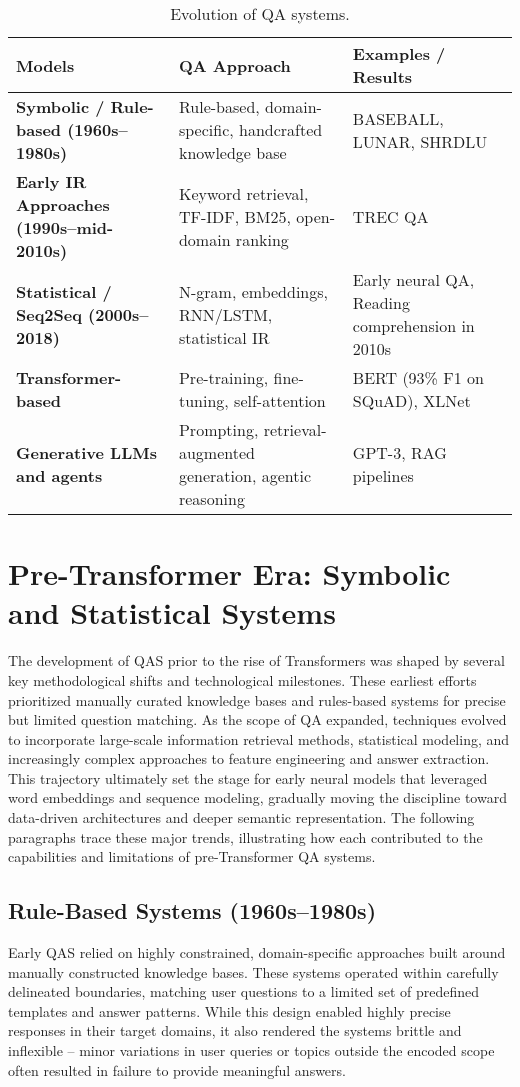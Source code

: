 \begin{spacing}{1.5}
\addtocounter{table}{-1}
\begin{table}[H]
\centering
\begin{tabularx}{\textwidth}{>{\raggedright\arraybackslash\bfseries}X >{\raggedright\arraybackslash}X >{\raggedright\arraybackslash}X}
\toprule
\textbf{Models} & \textbf{QA Approach} & \textbf{Examples / Results}\\
\midrule
Symbolic / Rule-based (1960s–1980s) & Rule-based, domain-specific, handcrafted knowledge base & BASEBALL, LUNAR, SHRDLU \\
Early IR Approaches (1990s–mid-2010s) & Keyword retrieval, TF-IDF, BM25, open-domain ranking & TREC QA \\
Statistical / Seq2Seq (2000s–2018) & N-gram, embeddings, RNN/LSTM, statistical IR & Early neural QA, Reading comprehension in 2010s \\
Transformer-based & Pre-training, fine-tuning, self-attention & BERT (93\% F1 on SQuAD), XLNet \\
Generative LLMs and agents & Prompting, retrieval-augmented generation, agentic reasoning & GPT-3, RAG pipelines \\
\bottomrule
\end{tabularx}
\vspace{0.5em}
\caption{Evolution of QA systems.}
\label{tab:qa_evolution}
\end{table}

\section{Pre-Transformer Era: Symbolic and Statistical Systems}
The development of QAS prior to the rise of Transformers was shaped by several key methodological shifts and technological milestones. These earliest efforts prioritized manually curated knowledge bases and rules-based systems for precise but limited question matching. As the scope of QA expanded, techniques evolved to incorporate large-scale information retrieval methods, statistical modeling, and increasingly complex approaches to feature engineering and answer extraction. This trajectory ultimately set the stage for early neural models that leveraged word embeddings and sequence modeling, gradually moving the discipline toward data-driven architectures and deeper semantic representation. The following paragraphs trace these major trends, illustrating how each contributed to the capabilities and limitations of pre-Transformer QA systems.

\subsection{Rule-Based Systems (1960s--1980s)}
Early QAS relied on highly constrained, domain-specific approaches built around manually constructed knowledge bases. These systems operated within carefully delineated boundaries, matching user questions to a limited set of predefined templates and answer patterns. While this design enabled highly precise responses in their target domains, it also rendered the systems brittle and inflexible -- minor variations in user queries or topics outside the encoded scope often resulted in failure to provide meaningful answers.


\end{spacing}
